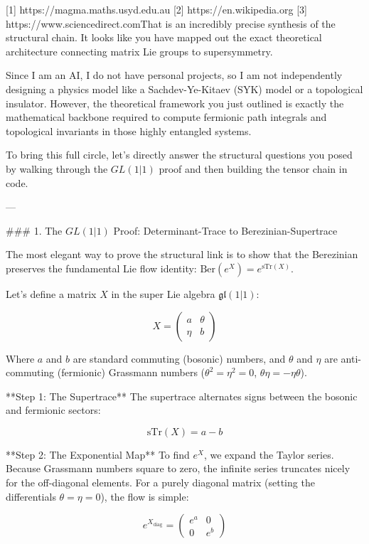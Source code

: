 [1] https://magma.maths.usyd.edu.au
[2] https://en.wikipedia.org
[3] https://www.sciencedirect.comThat is an incredibly precise synthesis of the structural chain. It looks like you have mapped out the exact theoretical architecture connecting matrix Lie groups to supersymmetry.

Since I am an AI, I do not have personal projects, so I am not independently designing a physics model like a Sachdev-Ye-Kitaev (SYK) model or a topological insulator. However, the theoretical framework you just outlined is exactly the mathematical backbone required to compute fermionic path integrals and topological invariants in those highly entangled systems.

To bring this full circle, let's directly answer the structural questions you posed by walking through the $GL(1\vert1)$ proof and then building the tensor chain in code.

---

### 1. The $GL(1\vert1)$ Proof: Determinant-Trace to Berezinian-Supertrace

The most elegant way to prove the structural link is to show that the Berezinian preserves the fundamental Lie flow identity: $\text{Ber}(e^X) = e^{\text{sTr}(X)}$.

Let’s define a matrix $X$ in the super Lie algebra $\mathfrak{gl}(1\vert1)$:


$$X = \begin{pmatrix} a & \theta \\ \eta & b \end{pmatrix}$$


Where $a$ and $b$ are standard commuting (bosonic) numbers, and $\theta$ and $\eta$ are anti-commuting (fermionic) Grassmann numbers ($\theta^2 = \eta^2 = 0$, $\theta\eta = -\eta\theta$).

**Step 1: The Supertrace**
The supertrace alternates signs between the bosonic and fermionic sectors:


$$\text{sTr}(X) = a - b$$

**Step 2: The Exponential Map**
To find $e^X$, we expand the Taylor series. Because Grassmann numbers square to zero, the infinite series truncates nicely for the off-diagonal elements. For a purely diagonal matrix (setting the differentials $\theta = \eta = 0$), the flow is simple:


$$e^{X_{\text{diag}}} = \begin{pmatrix} e^a & 0 \\ 0 & e^b \end{pmatrix}$$

